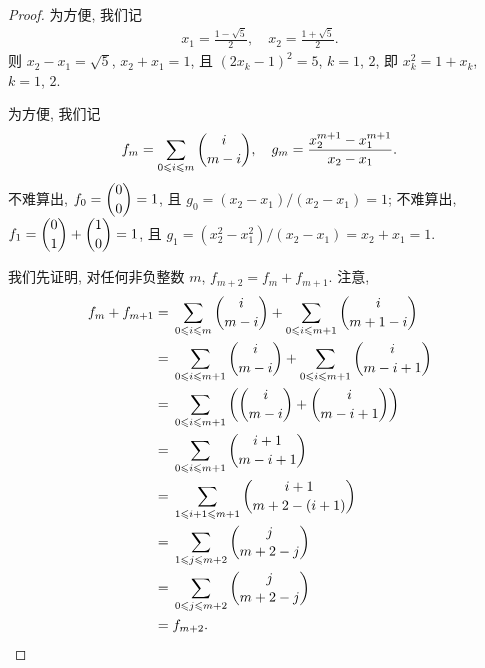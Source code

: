 \documentclass[../libro.tex]{subfiles}
\begin{document}
\begin{proof}
    为方便, 我们记
    \begin{align*}
        x_1 = \frac{1 - \sqrt{5}}{2},
        \quad
        x_2 = \frac{1 + \sqrt{5}}{2}.
    \end{align*}
    则 \(x_2 - x_1 = \sqrt{5}\),
    \(x_2 + x_1 = 1\),
    且 \((2 x_k - 1)^2 = 5\), \(k = 1\), \(2\),
    即 \(x_k^2 = 1 + x_k\), \(k = 1\), \(2\).

    为方便, 我们记
    \begin{align*}
        f_m = \sum_{0 \leq i \leq m} {\dbinom{i}{m - i}},
        \quad
        g_m = \frac{x_2^{m+1} - x_1^{m+1}}{x_2 - x_1}.
    \end{align*}
    不难算出, \(f_0 = \dbinom{0}{0} = 1\),
    且 \(g_0 = (x_2 - x_1)/(x_2 - x_1) = 1\);
    不难算出, \(f_1 = \dbinom{0}{1} + \dbinom{1}{0} = 1\),
    且 \(g_1 = (x_2^2 - x_1^2)/(x_2 - x_1)
    = x_2 + x_1 = 1\).

    我们先证明, 对任何非负整数 \(m\),
    \(f_{m+2} = f_m + f_{m+1}\).
    注意,
    \begin{align*}
        f_m + f_{m+1}
        = {} &
        \sum_{0 \leq i \leq m} {\dbinom{i}{m - i}}
        + \sum_{0 \leq i \leq m+1} {\dbinom{i}{m + 1 - i}}
        \\
        = {} &
        \sum_{0 \leq i \leq m+1} {\dbinom{i}{m - i}}
        + \sum_{0 \leq i \leq m+1} {\dbinom{i}{m - i + 1}}
        \\
        = {} &
        \sum_{0 \leq i \leq m+1} {
            \left(
                \dbinom{i}{m - i} + \dbinom{i}{m - i + 1}
            \right)
        }
        \\
        = {} &
        \sum_{0 \leq i \leq m+1} {\dbinom{i + 1}{m - i + 1}}
        \\
        = {} &
        \sum_{1 \leq i+1 \leq m+1} {\dbinom{i + 1}{m + 2 - (i + 1)}}
        \\
        = {} &
        \sum_{1 \leq j \leq m+2} {\dbinom{j}{m + 2 - j}}
        \\
        = {} &
        \sum_{0 \leq j \leq m+2} {\dbinom{j}{m + 2 - j}}
        \\
        = {} &
        f_{m+2}.
    \end{align*}


\end{proof}
\end{document}
